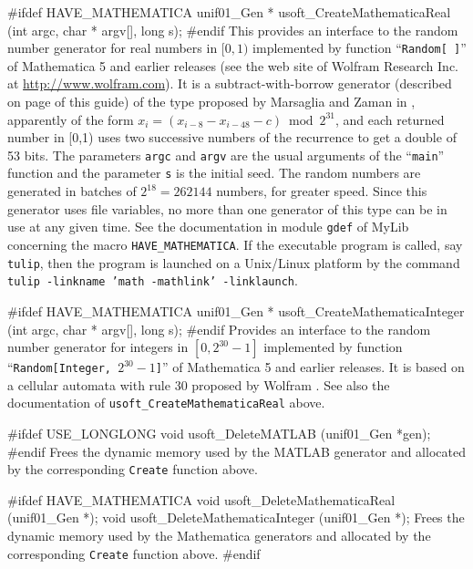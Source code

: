 {#ifdef HAVE_MATHEMATICA
   unif01_Gen * usoft_CreateMathematicaReal (int argc, char * argv[],
                                             long s);
#endif
\endcode
  \tab This provides an interface to the random number generator
%
  for real numbers in $[0, 1)$ implemented by function ``{\tt Random[ ]}'' of
  {Mathematica 5} and earlier releases (see the web site of
  Wolfram Research Inc. at \url{http://www.wolfram.com}). It is a
  subtract-with-borrow generator (described on page \pageref{gen:SWB}
   of this guide) of the type proposed by Marsaglia and Zaman
  in \cite{rMAR91a}, apparently of the form $x_i = (x_{i-8} - x_{i-48} - c) 
  \bmod 2^{31}$, and each returned number in [0,1) uses two successive numbers
  of the recurrence to get a double of 53 bits.
  The parameters {\tt argc} and  {\tt argv} are the usual 
  arguments of the ``{\tt main}'' function and the parameter 
  {\tt s} is the initial seed.  The random numbers are
  generated in batches of $2^{18} = 262144$ numbers, for greater
  speed. 
  Since this generator uses file variables, no more than one generator
  of this type can be in use at any given time. 
  See the documentation in module {\tt gdef} of MyLib concerning
  the macro  {\tt HAVE\_MATHEMATICA}.
  If the executable program is called, say \texttt{tulip}, then the program 
  is launched on a Unix/Linux platform by the command
  \texttt{tulip -linkname 'math -mathlink' -linklaunch}.
  \endtab
\code


#ifdef HAVE_MATHEMATICA
   unif01_Gen * usoft_CreateMathematicaInteger (int argc, char * argv[],
                                                long s);
#endif
\endcode
  \tab    Provides an interface to the random number generator
%
  for integers in $[0, 2^{30} - 1]$ implemented by function
   ``{\tt Random[Integer, {$2^{30} - 1$}]}'' of
  {Mathematica 5} and earlier releases. It is
  based on a cellular automata with rule 30 proposed by Wolfram
  \cite{rWOL86a}. See also the documentation of
  \texttt{usoft\_CreateMathematicaReal} above.
  \endtab


\code

#ifdef USE_LONGLONG
   void usoft_DeleteMATLAB (unif01_Gen *gen);
#endif
\endcode
 \tab  Frees the dynamic memory used by the {\sc MATLAB}
  generator and allocated by the corresponding {\tt Create} function
  above.
 \endtab
\code


#ifdef HAVE_MATHEMATICA
   void usoft_DeleteMathematicaReal (unif01_Gen *);
   void usoft_DeleteMathematicaInteger (unif01_Gen *);
\endcode
 \tab  Frees the dynamic memory used by the {\sc Mathematica}
  generators and allocated by the corresponding {\tt Create} function
  above.
 \endtab
\code
#endif


}
